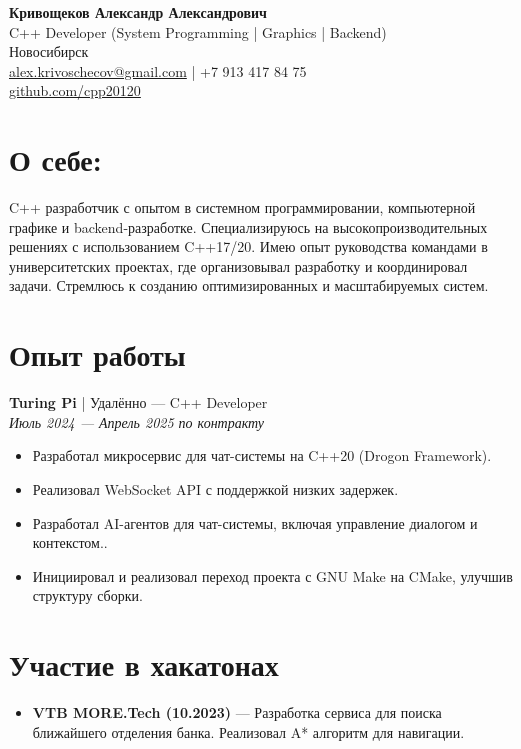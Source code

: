 \documentclass[a4paper,10pt]{article}
\begin{document}
	
	\begin{center}
		\textbf{\LARGE Кривощеков Александр Александрович} \\
		\small C++ Developer (System Programming | Graphics | Backend) \\
		Новосибирск \\
		\href{mailto:alex.krivoschecov@gmail.com}{alex.krivoschecov@gmail.com} | +7 913 417 84 75 \\
		\href{https://github.com/cpp20120}{github.com/cpp20120} 
	\end{center}
	
	\section*{О себе:}
	C++ разработчик с опытом в системном программировании, компьютерной графике и backend-разработке. Специализируюсь на высокопроизводительных решениях с использованием C++17/20. Имею опыт руководства командами в университетских проектах, где организовывал разработку и координировал задачи. Стремлюсь к созданию оптимизированных и масштабируемых систем.
	
	\section*{Опыт работы}
	\textbf{Turing Pi} | Удалённо — C++ Developer \\
	\textit{Июль 2024 — Апрель 2025 по контракту}
	\begin{itemize}[noitemsep]
		\item Разработал микросервис для чат-системы на C++20 (Drogon Framework).
		\item Реализовал WebSocket API с поддержкой низких задержек.
		\item Разработал AI-агентов для чат-системы, включая управление диалогом и контекстом..
		\item Инициировал и реализовал переход проекта с GNU Make на CMake, улучшив структуру сборки.
	\end{itemize}
	
	\section*{Участие в хакатонах}
	\begin{itemize}[noitemsep]
		\item \textbf{VTB MORE.Tech (10.2023)} — Разработка сервиса для поиска ближайшего отделения банка. Реализовал A* алгоритм для навигации.
	\end{itemize}
	
\end{document}
